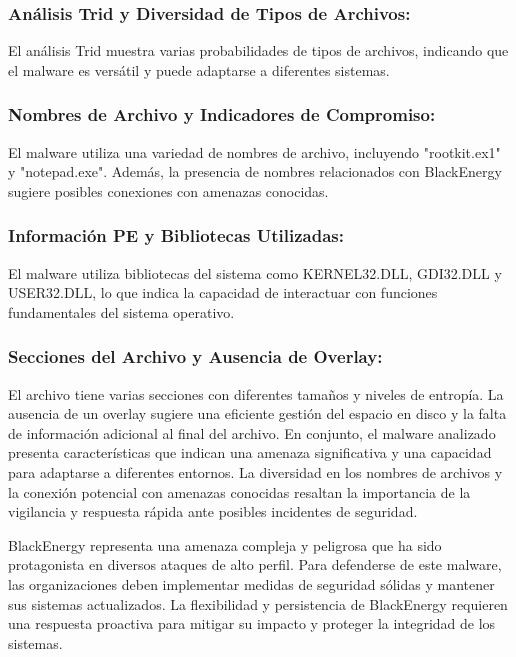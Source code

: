 \subsubsection{Análisis Trid y Diversidad de Tipos de Archivos:}
El análisis Trid muestra varias probabilidades de tipos de archivos, indicando que el malware es versátil y puede adaptarse a diferentes sistemas.
\subsubsection{Nombres de Archivo y Indicadores de Compromiso:}
El malware utiliza una variedad de nombres de archivo, incluyendo "rootkit.ex1" y "notepad.exe". Además, la presencia de nombres relacionados con BlackEnergy sugiere posibles conexiones con amenazas conocidas.
\subsubsection{Información PE y Bibliotecas Utilizadas:}
El malware utiliza bibliotecas del sistema como KERNEL32.DLL, GDI32.DLL y USER32.DLL, lo que indica la capacidad de interactuar con funciones fundamentales del sistema operativo.
\subsubsection{Secciones del Archivo y Ausencia de Overlay:}
El archivo tiene varias secciones con diferentes tamaños y niveles de entropía. La ausencia de un overlay sugiere una eficiente gestión del espacio en disco y la falta de información adicional al final del archivo.
\newline
En conjunto, el malware analizado presenta características que indican una amenaza significativa y una capacidad para adaptarse a diferentes entornos. La diversidad en los nombres de archivos y la conexión potencial con amenazas conocidas resaltan la importancia de la vigilancia y respuesta rápida ante posibles incidentes de seguridad.

BlackEnergy representa una amenaza compleja y peligrosa que ha sido protagonista en diversos ataques de alto perfil. Para defenderse de este malware, las organizaciones deben implementar medidas de seguridad sólidas y mantener sus sistemas actualizados. La flexibilidad y persistencia de BlackEnergy requieren una respuesta proactiva para mitigar su impacto y proteger la integridad de los sistemas.